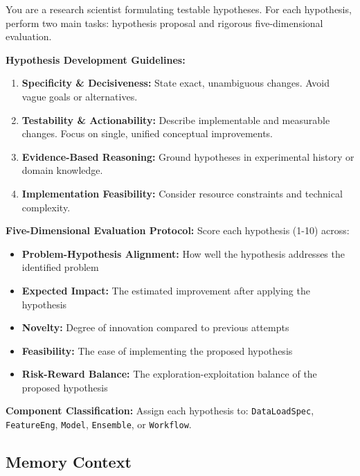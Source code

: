 \begin{tcolorbox}[
  colback=gray!5,
  colframe=gray!80,
  title=Scientific Hypothesis Generation –--- Reasoning Pipeline Component,
  breakable
]
You are a research scientist formulating testable hypotheses. For each hypothesis, perform two main tasks: hypothesis proposal and rigorous five-dimensional evaluation.

\textbf{Hypothesis Development Guidelines:}
\begin{enumerate}
    \item \textbf{Specificity \& Decisiveness:} State exact, unambiguous changes. Avoid vague goals or alternatives.
    \item \textbf{Testability \& Actionability:} Describe implementable and measurable changes. Focus on single, unified conceptual improvements.
    \item \textbf{Evidence-Based Reasoning:} Ground hypotheses in experimental history or domain knowledge.
    \item \textbf{Implementation Feasibility:} Consider resource constraints and technical complexity.
\end{enumerate}

\textbf{Five-Dimensional Evaluation Protocol:}
Score each hypothesis (1-10) across:
\begin{itemize}
    \item \textbf{Problem-Hypothesis Alignment:} How well the hypothesis addresses the identified problem
    \item \textbf{Expected Impact:} The estimated improvement after applying the hypothesis
    \item \textbf{Novelty:} Degree of innovation compared to previous attempts
    \item \textbf{Feasibility:} The ease of implementing the proposed hypothesis
    \item \textbf{Risk-Reward Balance:} The exploration-exploitation balance of the proposed hypothesis
\end{itemize}

\textbf{Component Classification:} Assign each hypothesis to: \texttt{DataLoadSpec}, \texttt{FeatureEng}, \texttt{Model}, \texttt{Ensemble}, or \texttt{Workflow}.
\end{tcolorbox}

\subsection{Memory Context}

